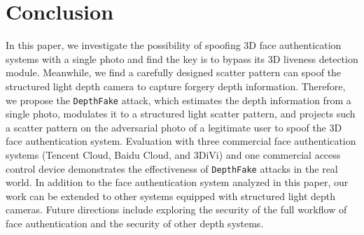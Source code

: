 \section{Conclusion}

In this paper, we investigate the possibility of spoofing 3D face authentication systems with a single photo and find the key is to bypass its 3D liveness detection module.
Meanwhile, we find a carefully designed scatter pattern can spoof the structured light depth camera to capture forgery depth information. 
Therefore, we propose the \texttt{DepthFake} attack, which estimates the depth information from a single photo, modulates it to a structured light scatter pattern, and projects such a scatter pattern  on the adversarial photo of a legitimate user to spoof the 3D face authentication system.
Evaluation with three commercial face authentication systems (Tencent Cloud, Baidu Cloud, and 3DiVi) and one commercial access control device demonstrates the effectiveness of \texttt{DepthFake}  attacks in the real world. In addition to the face authentication system analyzed in this paper, our work can be extended to other systems equipped with structured light depth cameras. Future directions include exploring the security of the full workflow of face authentication and the security of other depth systems.